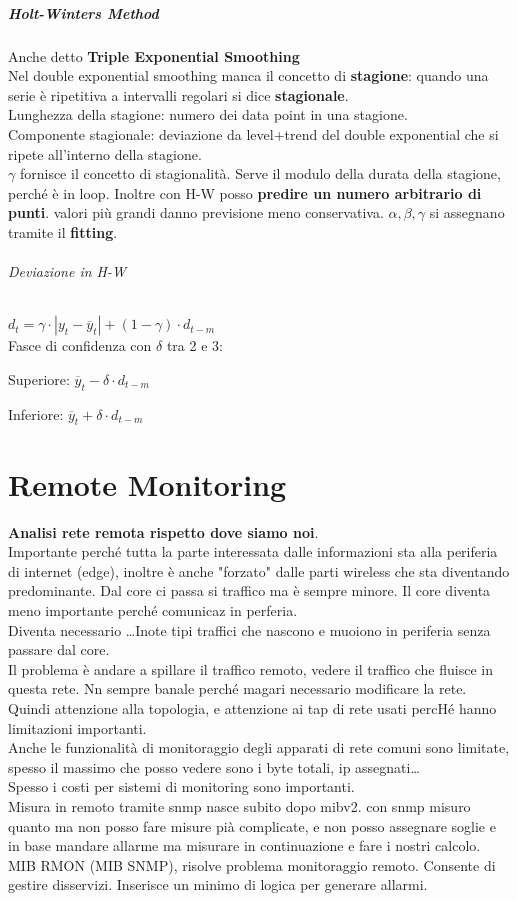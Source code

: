 \documentclass[10pt]{book}
\begin{document}
\paragraph{Holt-Winters Method} Anche detto \textbf{Triple Exponential Smoothing}\\
Nel double exponential smoothing manca il concetto di \textbf{stagione}: quando una serie è ripetitiva a intervalli regolari si dice \textbf{stagionale}.\\
Lunghezza della stagione: numero dei data point in una stagione.\\
Componente stagionale: deviazione da level+trend del double exponential che si ripete all'interno della stagione.\\
$\gamma$ fornisce il concetto di stagionalità. Serve il modulo della durata della stagione, perché è in loop. Inoltre con H-W posso \textbf{predire un numero arbitrario di punti}. valori più grandi danno previsione meno conservativa. $\alpha, \beta, \gamma$ si assegnano tramite il \textbf{fitting}.
\subparagraph{Deviazione in H-W} $d_t = \gamma\cdot |y_t - \overline{y}_t| + (1 - \gamma)\cdot d_{t-m}$\\
Fasce di confidenza con $\delta$ tra 2 e 3:
\begin{list}{}{}
	\item Superiore: $\overline{y}_t - \delta\cdot d_{t-m}$
	\item Inferiore: $\overline{y}_t + \delta\cdot d_{t-m}$
\end{list}
\chapter{Remote Monitoring}
\textbf{Analisi rete remota rispetto dove siamo noi}.\\
Importante perché tutta la parte interessata dalle informazioni sta alla periferia di internet (edge), inoltre è anche "forzato" dalle parti wireless che sta diventando predominante. Dal core ci passa si traffico ma è sempre minore. Il core diventa meno importante perché comunicaz in perferia.\\
Diventa necessario \ldots Inote tipi traffici che nascono e muoiono in periferia senza passare dal core.\\
Il problema è andare a spillare il traffico remoto, vedere il traffico che fluisce in questa rete. Nn sempre banale perché magari necessario modificare la rete. Quindi attenzione alla topologia, e attenzione ai tap di rete usati percHé hanno limitazioni importanti.\\
Anche le funzionalità di monitoraggio degli apparati di rete comuni sono limitate, spesso il massimo che posso vedere sono i byte totali, ip assegnati\ldots\\
Spesso i costi per sistemi di monitoring sono importanti.\\
Misura in remoto tramite snmp nasce subito dopo mibv2. con snmp misuro quanto ma non posso fare misure pià complicate, e non posso assegnare soglie e in base mandare allarme ma misurare in continuazione e fare i nostri calcolo.\\
MIB RMON (MIB SNMP), risolve problema monitoraggio remoto. Consente di gestire disservizi. Inserisce un minimo di logica per generare allarmi.
\end{document}
